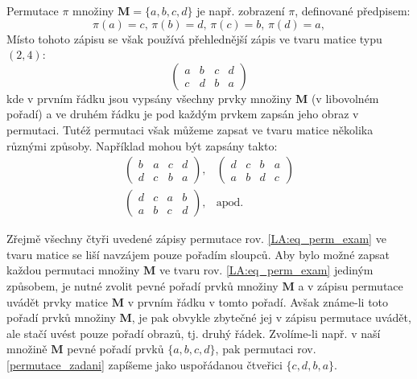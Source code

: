 {      \begin{example}%
        Permutace \(\pi\) množiny \(\mathbf{M}= \lbrace a,b,c,d\rbrace\) je např. zobrazení 
        \(\pi\), definované předpisem:
        \begin{equation}\label{permutace_zadani}
          \pi\left(a\right) = c, \,
          \pi\left(b\right) = d, \,
          \pi\left(c\right) = b, \,
          \pi\left(d\right) = a,
        \end{equation}
        Místo tohoto zápisu se však používá přehlednější zápis ve tvaru matice typu \((2,4)\):
        \begin{equation}\label{LA:eq_perm_exam}
            \begin{pmatrix}
            a & b & c & d \\
            c & d & b & a
            \end{pmatrix}
        \end{equation}
        kde v prvním řádku jsou vypsány všechny prvky množiny \(\mathbf{M}\) (v libovolném pořadí) 
        a ve druhém řádku je pod každým prvkem zapsán jeho obraz v permutaci. Tutéž permutaci však 
        můžeme zapsat ve tvaru matice několika různými způsoby. Například mohou být zapsány takto:
        \begin{equation}
          \begin{array}{cc}
            \begin{pmatrix}
              b & a & c & d \\
              d & c & b & a
            \end{pmatrix},         & 
            \begin{pmatrix}
              d & c & b & a \\
              a & b & d & c
            \end{pmatrix}          \\
            \begin{pmatrix}
              d & c & a & b \\
              a & b & c & d
            \end{pmatrix},         &
            \text{apod.}
          \end{array}
        \end{equation}
      \end{example}

      Zřejmě všechny čtyři uvedené zápisy permutace rov. \ref{LA:eq_perm_exam} ve tvaru matice se 
      liší navzájem pouze pořadím sloupců. Aby bylo možné zapsat každou permutaci množiny 
      \(\mathbf{M}\) ve tvaru rov. \ref{LA:eq_perm_exam} jediným způsobem, je nutné zvolit pevné 
      pořadí prvků množiny \(\mathbf{M}\)  a v zápisu permutace uvádět prvky matice \(\mathbf{M}\)  
      v prvním řádku v tomto pořadí. Avšak známe-li toto pořadí prvků množiny \(\mathbf{M}\), je 
      pak  obvykle zbytečné jej v zápisu permutace uvádět, ale stačí uvést pouze pořadí obrazů, tj. 
      druhý řádek. Zvolíme-li např. v naší množině \(\mathbf{M}\) pevné pořadí prvků \(\lbrace 
      a,b,c,d\rbrace\), pak permutaci rov. \ref{permutace_zadani} zapíšeme jako uspořádanou 
      čtveřici \(\lbrace c,d,b,a\rbrace\).
  
}
